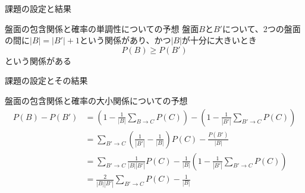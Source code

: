 \begin{frame}{課題の設定と結果}
    \begin{block}{盤面の包含関係と確率の単調性についての予想}
        盤面\(B\)と\(B'\)について、2つの盤面の間に\(|B| = |B'| + 1\)という関係があり、かつ\(|B|\)が十分に大きいとき
        \begin{equation}
            P(B) \geq P(B')
        \end{equation}
        という関係がある
    \end{block}
\end{frame}

\begin{frame}{課題の設定とその結果}
    \begin{block}{盤面の包含関係と確率の大小関係についての予想}
        \begin{align}
            P(B) - P(B')    &= \left(1 - \frac{1}{|B|} \sum_{B \rightarrow C} P(C)\right) - \left(1 - \frac{1}{|B'|} \sum_{B' \rightarrow C} P(C)\right) \\
                            &= \sum_{B' \rightarrow C} \left(\frac{1}{|B'|} - \frac{1}{|B|}\right) P(C) - \frac{P(B')}{|B|} \\
                            &= \sum_{B' \rightarrow C} \frac{1}{|B||B'|} P(C) - \frac{1}{|B|} \left(1 - \frac{1}{|B'|}\sum_{B' \rightarrow C} P(C)\right) \\
                            &= \frac{2}{|B||B'|} \sum_{B' \rightarrow C} P(C) - \frac{1}{|B|}
        \end{align}
    \end{block}
\end{frame}